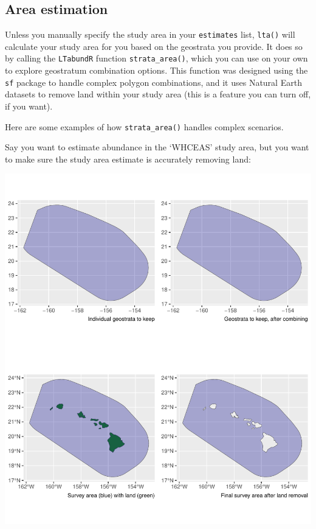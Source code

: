 \documentclass[
]{book}
\newenvironment{Shaded}{\begin{snugshade}}{\end{snugshade}}
\newcommand{\AttributeTok}[1]{\textcolor[rgb]{0.13,0.29,0.53}{#1}}
\newcommand{\ConstantTok}[1]{\textcolor[rgb]{0.56,0.35,0.01}{#1}}
\newcommand{\FunctionTok}[1]{\textcolor[rgb]{0.13,0.29,0.53}{\textbf{#1}}}
\newcommand{\NormalTok}[1]{#1}
\newcommand{\OtherTok}[1]{\textcolor[rgb]{0.56,0.35,0.01}{#1}}
\newcommand{\SpecialCharTok}[1]{\textcolor[rgb]{0.81,0.36,0.00}{\textbf{#1}}}
\newcommand{\StringTok}[1]{\textcolor[rgb]{0.31,0.60,0.02}{#1}}
\begin{document}
\hypertarget{area-estimation}{%
\subsection*{Area estimation}\label{area-estimation}}

Unless you manually specify the study area in your \texttt{estimates} list, \texttt{lta()} will calculate your study area for you based on the geostrata you provide. It does so by calling the \texttt{LTabundR} function \texttt{strata\_area()}, which you can use on your own to explore geostratum combination options. This function was designed using the \texttt{sf} package to handle complex polygon combinations, and it uses Natural Earth datasets to remove land within your study area (this is a feature you can turn off, if you want).

Here are some examples of how \texttt{strata\_area()} handles complex scenarios.

Say you want to estimate abundance in the `WHCEAS' study area, but you want to make sure the study area estimate is accurately removing land:

\begin{Shaded}
\end{Shaded}

\includegraphics{figures/unnamed-chunk-253-1.pdf}
\end{document}
